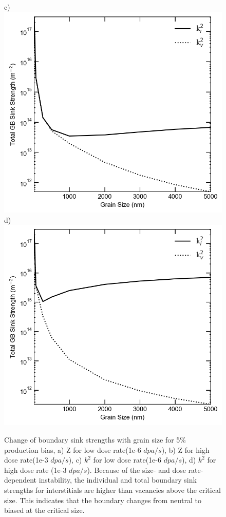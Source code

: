 \documentclass[utf8]{frontiersSCNS} %
\begin{document}
\begin{figure}[h!]
        c)\includegraphics[scale=0.55]{Fig9_c}
        d)\includegraphics[scale=0.55]{Fig9_d}
        \caption{Change of boundary sink strengths with grain size for 5\% production bias, a) Z for low dose rate(1e-6 $dpa/s$), b) Z for high dose rate(1e-3 $dpa/s$), c) $k^2$ for low dose rate(1e-6 $dpa/s$), d) $k^2$ for high dose rate (1e-3 $dpa/s$). Because of the size- and dose rate-dependent instability, the individual and total boundary sink strengths for interstitials are higher than vacancies above the critical size. This indicates that the boundary changes from neutral to biased at the critical size.}
        \label{figure:sink_strengths_neutron_5_1e-6}
    \end{figure}
    
\end{document}
